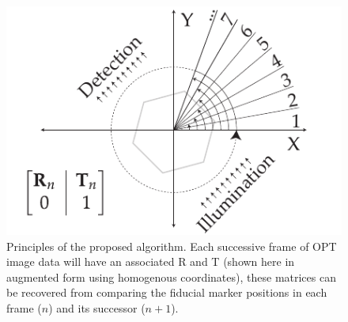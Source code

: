 \documentclass{osa-article}
\begin{document}
\begin{figure}
  \centering
  \includegraphics{./figures/flOPT_principle}
  \caption[Principles of the proposed algorithm]{Principles of the proposed algorithm. Each successive frame of OPT image data will have an associated \gls*{R} and \gls*{T} (shown here in augmented form using homogenous coordinates), these matrices can be recovered from comparing the fiducial marker positions in each frame (\(n\)) and its successor (\(n+1\)).}
\end{figure}
\end{document}
